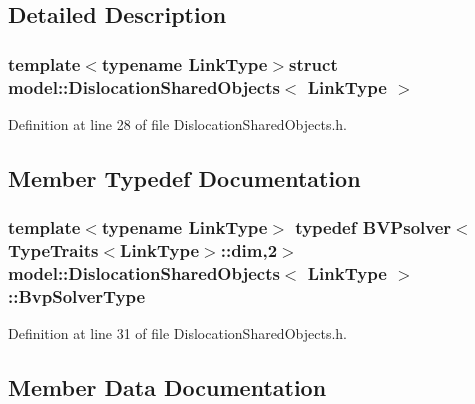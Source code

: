 \subsection{Detailed Description}
\subsubsection*{template$<$typename Link\+Type$>$struct model\+::\+Dislocation\+Shared\+Objects$<$ Link\+Type $>$}



Definition at line 28 of file Dislocation\+Shared\+Objects.\+h.



\subsection{Member Typedef Documentation}
\hypertarget{structmodel_1_1_dislocation_shared_objects_a7562afb5a99947edfee0669cfe78f8b6}{}
\subsubsection[{Bvp\+Solver\+Type}]{\setlength{\rightskip}{0pt plus 5cm}template$<$typename Link\+Type$>$ typedef {\bf B\+V\+Psolver}$<${\bf Type\+Traits}$<${\bf Link\+Type}$>$\+::{\bf dim},2$>$ {\bf model\+::\+Dislocation\+Shared\+Objects}$<$ {\bf Link\+Type} $>$\+::{\bf Bvp\+Solver\+Type}}\label{structmodel_1_1_dislocation_shared_objects_a7562afb5a99947edfee0669cfe78f8b6}


Definition at line 31 of file Dislocation\+Shared\+Objects.\+h.



\subsection{Member Data Documentation}
\hypertarget{structmodel_1_1_dislocation_shared_objects_a1ebde927216271979599e324ce29e65a}{}
